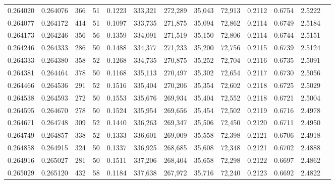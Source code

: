 \begin{tabular}{rrrrrrrrrrrrr}
0.264020 & 0.264076 &   366 &  51 &                                     0.1223 & 333,321 & 272,289 &  35,043 &  72,913 & 0.2112 & 0.6754 & 2.5222 \\
0.264077 & 0.264172 &   414 &  51 &                                     0.1097 & 333,735 & 271,875 &  35,094 &  72,862 & 0.2114 & 0.6749 & 2.5184 \\
0.264173 & 0.264246 &   356 &  56 &                                     0.1359 & 334,091 & 271,519 &  35,150 &  72,806 & 0.2114 & 0.6744 & 2.5151 \\
0.264246 & 0.264333 &   286 &  50 &                                     0.1488 & 334,377 & 271,233 &  35,200 &  72,756 & 0.2115 & 0.6739 & 2.5124 \\
0.264333 & 0.264380 &   358 &  52 &                                     0.1268 & 334,735 & 270,875 &  35,252 &  72,704 & 0.2116 & 0.6735 & 2.5091 \\
0.264381 & 0.264464 &   378 &  50 &                                     0.1168 & 335,113 & 270,497 &  35,302 &  72,654 & 0.2117 & 0.6730 & 2.5056 \\
0.264466 & 0.264536 &   291 &  52 &                                     0.1516 & 335,404 & 270,206 &  35,354 &  72,602 & 0.2118 & 0.6725 & 2.5029 \\
0.264538 & 0.264593 &   272 &  50 &                                     0.1553 & 335,676 & 269,934 &  35,404 &  72,552 & 0.2118 & 0.6721 & 2.5004 \\
0.264595 & 0.264670 &   278 &  50 &                                     0.1524 & 335,954 & 269,656 &  35,454 &  72,502 & 0.2119 & 0.6716 & 2.4978 \\
0.264671 & 0.264748 &   309 &  52 &                                     0.1440 & 336,263 & 269,347 &  35,506 &  72,450 & 0.2120 & 0.6711 & 2.4950 \\
0.264749 & 0.264857 &   338 &  52 &                                     0.1333 & 336,601 & 269,009 &  35,558 &  72,398 & 0.2121 & 0.6706 & 2.4918 \\
0.264858 & 0.264915 &   324 &  50 &                                     0.1337 & 336,925 & 268,685 &  35,608 &  72,348 & 0.2121 & 0.6702 & 2.4888 \\
0.264916 & 0.265027 &   281 &  50 &                                     0.1511 & 337,206 & 268,404 &  35,658 &  72,298 & 0.2122 & 0.6697 & 2.4862 \\
0.265029 & 0.265120 &   432 &  58 &                                     0.1184 & 337,638 & 267,972 &  35,716 &  72,240 & 0.2123 & 0.6692 & 2.4822 \\

\end{tabular}
